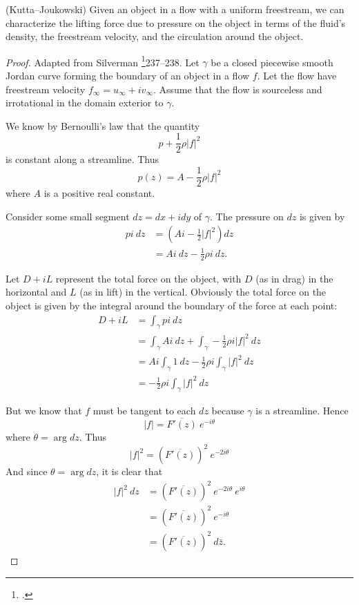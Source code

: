 \documentclass[letterpaper, twoside, 12 pt]{article}
\begin{document}
	\begin{theorem}(Kutta--Joukowski)
		Given an object in a flow with a uniform freestream, we can characterize the lifting force due to pressure on the object in terms of the fluid's density, the freestream velocity, and the circulation around the object.
	\end{theorem}
	\begin{proof}
		Adapted from Silverman \footcite{silverman}{237--238}.
		Let $\gamma$ be a closed piecewise smooth Jordan curve forming the boundary of an object in a flow $f$.
		Let the flow have freestream velocity $f_\infty = u_\infty + i v_\infty$.
		Assume that the flow is sourceless and irrotational in the domain exterior to $\gamma$.

		We know by Bernoulli's law that the quantity 
		\[
			p + \frac{1}{2} \rho |f|^2
		\]
		is constant along a streamline.
		Thus
		\[
			p(z) = A - \frac{1}{2} \rho |f|^2
		\]
		where $A$ is a positive real constant.

		Consider some small segment $dz = dx + i dy$ of $\gamma$.
		The pressure on $dz$ is given by 
		\begin{align*}
			p i \> dz &= \left(  A i - \frac{1}{2} |f|^2 \right) dz \\
			&= Ai \> dz - \frac{1}{2} \rho i \> dz.
		\end{align*}
		
		Let $D + iL$ represent the total force on the object, with $D$ (as in drag) in the horizontal and $L$ (as in lift) in the vertical.
		Obviously the total force on the object is given by the integral around the boundary of the force at each point:
		\begin{align*}
			D + iL &= \int_\gamma p i \ dz  \\
			&= \int_\gamma Ai \ dz + \int_\gamma -\frac{1}{2} \rho i |f|^2 \ dz \\
			&= Ai \int_\gamma 1 \ dz - \frac{1}{2} \rho i \int_\gamma |f|^2 \ dz \\
			&= - \frac{1}{2} \rho i \int_\gamma |f|^2 \ dz
		\end{align*}

		But we know that $f$ must be tangent to each $dz$ because $\gamma$ is a streamline.
		Hence
		\[
			|f| = \overline{F'(z)}\> e^{-i \theta}
		\]
		where $\theta = \arg dz$.
		Thus
		\[
			|f|^2 = \left( \overline{F'(z)} \right)^2 \> e^{-2i \theta}
		\]
		And since $\theta = \arg dz$, it is clear that 
		\begin{align*}
			|f|^2 \ dz &= \left( \overline{F'(z)} \right)^2 \> e^{-2i \theta} \> e^{i \theta} \\
			&= \left( \overline{F'(z)} \right)^2 \> e^{-i \theta} \\
			&= \left( \overline{F'(z)} \right)^2 \ d \bar z.
		\end{align*}
		

\end{proof}
\end{document}
